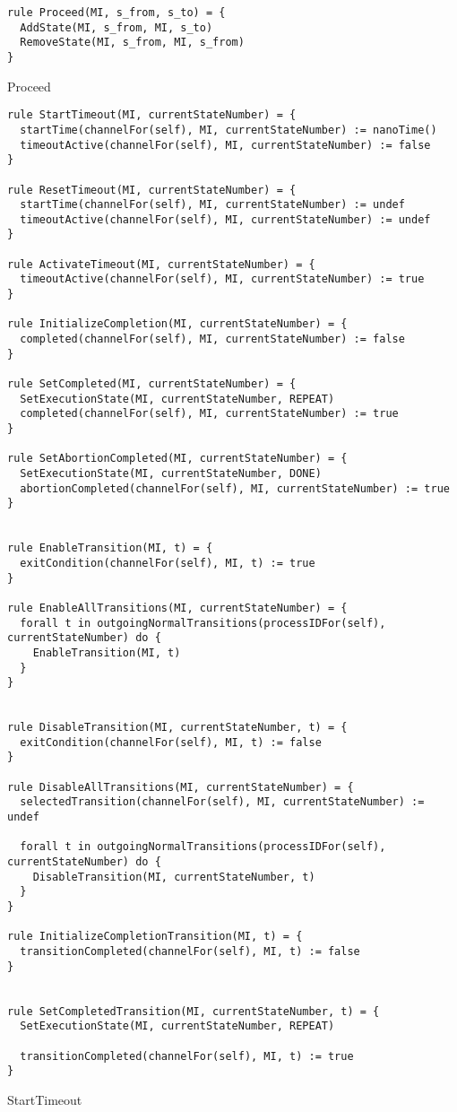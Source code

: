 \begin{listing}[H]
\begin{verbatim}
rule Proceed(MI, s_from, s_to) = {
  AddState(MI, s_from, MI, s_to)
  RemoveState(MI, s_from, MI, s_from)
}
\end{verbatim}
\caption{Proceed}
\label{lst:asm:Proceed}
\end{listing}




\begin{listing}[H]
\begin{verbatim}
rule StartTimeout(MI, currentStateNumber) = {
  startTime(channelFor(self), MI, currentStateNumber) := nanoTime()
  timeoutActive(channelFor(self), MI, currentStateNumber) := false
}

rule ResetTimeout(MI, currentStateNumber) = {
  startTime(channelFor(self), MI, currentStateNumber) := undef
  timeoutActive(channelFor(self), MI, currentStateNumber) := undef
}

rule ActivateTimeout(MI, currentStateNumber) = {
  timeoutActive(channelFor(self), MI, currentStateNumber) := true
}

rule InitializeCompletion(MI, currentStateNumber) = {
  completed(channelFor(self), MI, currentStateNumber) := false
}

rule SetCompleted(MI, currentStateNumber) = {
  SetExecutionState(MI, currentStateNumber, REPEAT)
  completed(channelFor(self), MI, currentStateNumber) := true
}

rule SetAbortionCompleted(MI, currentStateNumber) = {
  SetExecutionState(MI, currentStateNumber, DONE)
  abortionCompleted(channelFor(self), MI, currentStateNumber) := true
}


rule EnableTransition(MI, t) = {
  exitCondition(channelFor(self), MI, t) := true
}

rule EnableAllTransitions(MI, currentStateNumber) = {
  forall t in outgoingNormalTransitions(processIDFor(self), currentStateNumber) do {
    EnableTransition(MI, t)
  }
}


rule DisableTransition(MI, currentStateNumber, t) = {
  exitCondition(channelFor(self), MI, t) := false
}

rule DisableAllTransitions(MI, currentStateNumber) = {
  selectedTransition(channelFor(self), MI, currentStateNumber) := undef

  forall t in outgoingNormalTransitions(processIDFor(self), currentStateNumber) do {
    DisableTransition(MI, currentStateNumber, t)
  }
}

rule InitializeCompletionTransition(MI, t) = {
  transitionCompleted(channelFor(self), MI, t) := false
}


rule SetCompletedTransition(MI, currentStateNumber, t) = {
  SetExecutionState(MI, currentStateNumber, REPEAT)

  transitionCompleted(channelFor(self), MI, t) := true
}
\end{verbatim}
\caption{StartTimeout}
\label{lst:asm:StartTimeout}
\end{listing}





